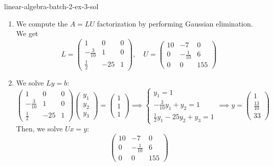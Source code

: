 \documentclass[preview]{standalone}
\begin{document}
\begin{snippetsolution}{linear-algebra-batch-2-ex-3-sol}{}
    \begin{enumerate}
        \item We compute the \(A = LU\) factorization by performing Gaussian elimination. We get
        \[
            L = \begin{pmatrix}
                1 & 0 & 0 \\ -\frac{3}{10} & 1 & 0 \\ \frac{1}{2} & -25 & 1
            \end{pmatrix}, \quad
            U = \begin{pmatrix}
                10 & -7 & 0 \\ 0 & -\frac{1}{10} & 6 \\ 0 & 0 & 155
            \end{pmatrix}
        \]
        \item We solve \(Ly = b\):
        \[
            \begin{pmatrix}
                1 & 0 & 0 \\ -\frac{3}{10} & 1 & 0 \\ \frac{1}{2} & -25 & 1
            \end{pmatrix} \begin{pmatrix}
                y_1 \\ y_2 \\ y_3
            \end{pmatrix} = \begin{pmatrix}
                1 \\ 1 \\ 1
            \end{pmatrix} \implies
            \begin{cases}
                y_1 = 1 \\
                -\frac{3}{10}y_1 + y_2 = 1 \\
                \frac{1}{2}y_1 - 25y_2 + y_3 = 1
            \end{cases} \implies
            y = \begin{pmatrix}
                1 \\ \frac{13}{10} \\ 33
            \end{pmatrix}
        \]
        Then, we solve \(Ux = y\):
        \[
            \begin{pmatrix}
                10 & -7 & 0 \\ 0 & -\frac{1}{10} & 6 \\ 0 & 0 & 155

\end{pmatrix}\]
\end{enumerate}
\end{snippetsolution}
\end{document}
